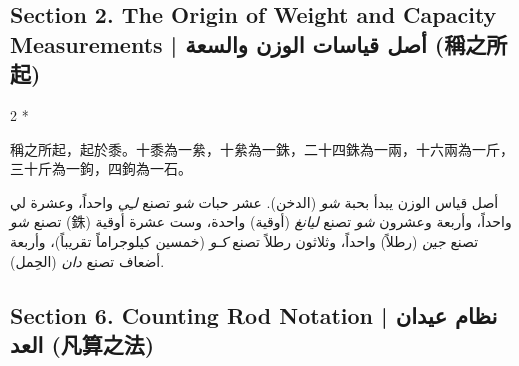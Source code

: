 \documentclass[11pt,a4paper]{article}
\newcommand{\ar}[1]{\arabicfont\beginR #1\endR}
\newcommand{\zh}[1]{{\CJKfamily{}#1}}
\begin{document}
\subsection*{Section 2. The Origin of Weight and Capacity Measurements | \ar{أصل قياسات الوزن والسعة} (\zh{稱之所起})}

\begin{paracol}{2}
\switchcolumn[0]*\noindent
\begin{tcolorbox}[colback=chinesebg,colframe=rulecolor,boxrule=0.5pt,left=6pt,right=6pt,top=4pt,bottom=4pt]
\zh{稱之所起，起於黍。十黍為一絫，十絫為一銖，二十四銖為一兩，十六兩為一斤，三十斤為一鉤，四鉤為一石。}
\end{tcolorbox}

\switchcolumn
\begin{tcolorbox}[colback=arabicbg,colframe=rulecolor!70!green,boxrule=0.5pt,left=6pt,right=6pt,top=4pt,bottom=4pt]
\arabicfont\raggedleft
أصل قياس الوزن يبدأ بحبة \textit{شو} (الدخن). عشر حبات \textit{شو} تصنع \textit{لـِي} واحداً، وعشرة لي تصنع \textit{شو} (\zh{銖}) واحداً، وأربعة وعشرون \textit{شو} تصنع \textit{ليانغ} (أوقية) واحدة، وست عشرة أوقية تصنع \textit{جين} (رطلاً) واحداً، وثلاثون رطلاً تصنع \textit{كـو} (خمسين كيلوجراماً تقريباً)، وأربعة أضعاف تصنع \textit{دان} (الحِمل).
\end{tcolorbox}
\end{paracol}

\subsection*{Section 6. Counting Rod Notation | \ar{نظام عيدان العد} (\zh{凡算之法})}
\end{document}
